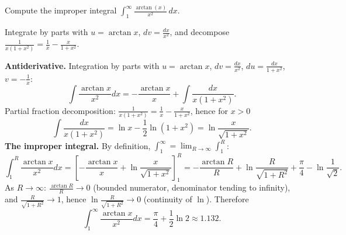 
\begin{question}
Compute the improper integral $\displaystyle\int_1^\infty\frac{\arctan(x)}{x^2}\,dx$.
\end{question}

\begin{hint}
Integrate by parts with $u=\arctan x$, $dv=\frac{dx}{x^2}$, and decompose $\frac{1}{x(1+x^2)}=\frac1x-\frac{x}{1+x^2}$.
\end{hint}

\begin{solution}
\textbf{Antiderivative.} Integration by parts with $u=\arctan x$, $dv=\frac{dx}{x^2}$, $du=\frac{dx}{1+x^2}$, $v=-\frac1x$:
\[
\int\frac{\arctan x}{x^2}dx=-\frac{\arctan x}{x}+\int\frac{dx}{x(1+x^2)}.
\]
Partial fraction decomposition: $\frac{1}{x(1+x^2)}=\frac1x-\frac{x}{1+x^2}$, hence for $x>0$
\[
\int\frac{dx}{x(1+x^2)}=\ln x-\frac12\ln(1+x^2)=\ln\frac{x}{\sqrt{1+x^2}}.
\]
\textbf{The improper integral.} By definition, $\int_1^\infty=\lim_{R\to\infty}\int_1^R$:
\[
\int_1^R\frac{\arctan x}{x^2}dx=\left[-\frac{\arctan x}{x}+\ln\frac{x}{\sqrt{1+x^2}}\right]_1^R
=-\frac{\arctan R}{R}+\ln\frac{R}{\sqrt{1+R^2}}+\frac\pi4-\ln\frac1{\sqrt2}.
\]
As $R\to\infty$: $\frac{\arctan R}{R}\to0$ (bounded numerator, denominator tending to infinity), and $\frac{R}{\sqrt{1+R^2}}\to1$, hence $\ln\frac{R}{\sqrt{1+R^2}}\to0$ (continuity of $\ln$). Therefore
\[
\int_1^\infty\frac{\arctan x}{x^2}dx=\frac\pi4+\frac12\ln2\approx1.132.
\]
\end{solution}
